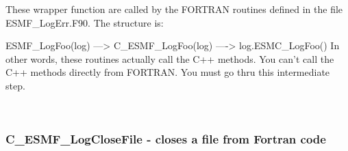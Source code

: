  
\setlength{\parskip}{0pt}
\setlength{\parindent}{0pt}
\setlength{\baselineskip}{11pt}
 
\def\bv{\begin{verbatim}}
\def\ev{\end{verbatim}}
\def\be{\begin{equation}}
\def\ee{\end{equation}}
\def\bea{\begin{eqnarray}}
\def\eea{\end{eqnarray}}
\def\bi{\begin{itemize}}
\def\ei{\end{itemize}}
\def\bn{\begin{enumerate}}
\def\en{\end{enumerate}}
\def\bd{\begin{description}}
\def\ed{\end{description}}
\def\({\left (}
\def\){\right )}
\def\[{\left [}
\def\]{\right ]}
\def\<{\left  \langle}
\def\>{\right \rangle}
\def\cI{{\cal I}}
\def\diag{\mathop{\rm diag}}
\def\tr{\mathop{\rm tr}}


 

   These wrapper function are called by the FORTRAN routines defined in the file 
   ESMF\_LogErr.F90.  The structure is:
    
      ESMF\_LogFoo(log) --->  C\_ESMF\_LogFoo(log)  ----> log.ESMC\_LogFoo()
   In other words, these routines actually call the C++ methods.  You can't call
   the C++ methods directly from FORTRAN.  You must go thru this intermediate step.
   
 
\mbox{}\hrulefill\ 
 
\subsubsection [C\_ESMF\_LogCloseFile] {C\_ESMF\_LogCloseFile - closes a file from Fortran code}


